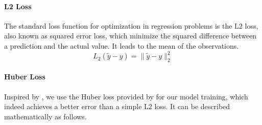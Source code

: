 \paragraph{L2 Loss}
The standard loss function for optimization in regression problems is the L2 loss, also known as squared error loss, which minimize the squared difference between a prediction and the actual value. It leads to the mean of the observations. 
\[ L_2(\tilde y - y) = \|\tilde y - y \|_2^2 \]


%
%


\paragraph{Huber Loss}
Inspired by \cite{img2depth}, we use the Huber loss provided by \cite{berhu-loss} for our model training, which indeed achieves a better error than a simple L2 loss. It can be described mathematically as follows.


